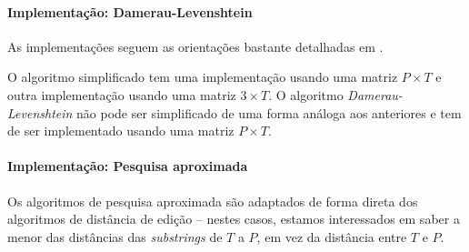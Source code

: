 \documentclass[relatorio.tex]{subfiles}
\begin{document}
\paragraph{Implementação: Damerau-Levenshtein}
As implementações seguem as orientações bastante detalhadas em \cite{damerau}.

O algoritmo simplificado tem uma implementação usando uma matriz $P\times T$ e outra implementação usando uma matriz $3\times T$. O algoritmo \emph{Damerau-Levenshtein} não pode ser simplificado de uma forma análoga aos anteriores e tem de ser implementado usando uma matriz $P\times T$.

\paragraph{Implementação: Pesquisa aproximada}
Os algoritmos de pesquisa aproximada são adaptados de forma direta dos algoritmos de distância de edição -- nestes casos, estamos interessados em saber a menor das distâncias das \textit{substrings} de $T$ a $P$, em vez da distância entre $T$ e $P$.
\end{document}
